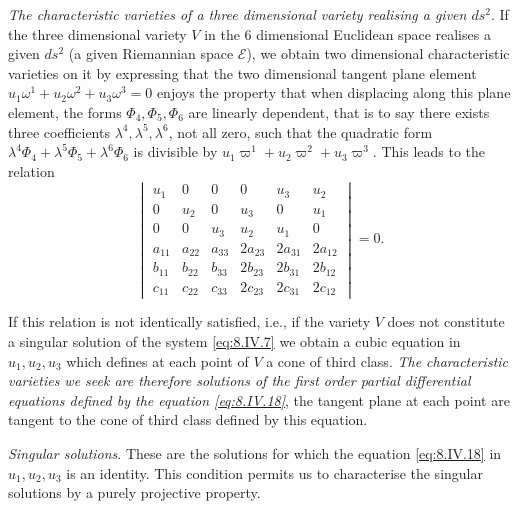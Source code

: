 \documentclass[leqno,11pt]{book}
\numberwithin{equation}{chapter}
\theoremstyle{shape1}
\theoremstyle{shape0}
\theoremstyle{shape2}
\theoremstyle{definition}
\begin{document}
\vspace{12pt}\fsec \emph{The characteristic varieties of a three dimensional variety realising a given $ds^{2}$}. If the three dimensional variety $V$ in the $6$ dimensional Euclidean space realises a given $ds^{2}$ (a given Riemannian space $\mathcal{E}$), we obtain two dimensional characteristic varieties on it by expressing that the two dimensional tangent plane element $u_{1}\omega^{1}+u_{2}\omega^{2}+u_{3}\omega^{3}=0$ enjoys the property that when displacing along this plane element, the forms $\Phi_{4},\Phi_{5},\Phi_{6}$ are linearly dependent, that is to say there exists three coefficients $\lambda^{4},\lambda^{5},\lambda^{6}$, not all zero, such that the quadratic form $\lambda^{4}\Phi_{4}+\lambda^{5}\Phi_{5}+\lambda^{6}\Phi_{6}$ is divisible by $u_{1}\varpi^{1}+u_{2}\varpi^{2}+u_{3}\varpi^{3}$. This leads to the relation
\begin{equation}
  \label{eq:8.IV.18}\tag{IV, 18}
  \begin{vmatrix}
    u_{1}&0&0&0&u_{3}&u_{2}\\
    0&u_{2}&0&u_{3}&0&u_{1}\\
    0&0&u_{3}&u_{2}&u_{1}&0\\
    a_{11}&a_{22}&a_{33}&2a_{23}&2a_{31}&2a_{12}\\
    b_{11}&b_{22}&b_{33}&2b_{23}&2b_{31}&2b_{12}\\
    c_{11}&c_{22}&c_{33}&2c_{23}&2c_{31}&2c_{12}
  \end{vmatrix}=0.
\end{equation}

If this relation is not identically satisfied, i.e., if the variety $V$ does not constitute a singular solution of the system \eqref{eq:8.IV.7} we obtain a cubic equation in $u_{1},u_{2},u_{3}$ which defines at each point of $V$ a cone of third class. \emph{The characteristic varieties we seek are therefore solutions of the first order partial differential equations defined by the equation \eqref{eq:8.IV.18}}, the tangent plane at each point are tangent to the cone of third class defined by this equation.

\vspace{12pt}\fsec \emph{Singular solutions}. These are the solutions for which the equation \eqref{eq:8.IV.18} in $u_{1},u_{2},u_{3}$ is an identity. This condition permits us to characterise the singular solutions by a purely projective property.
\end{document}
